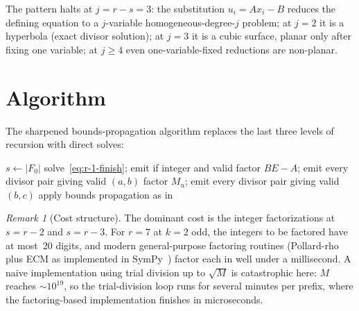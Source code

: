 \documentclass[11pt]{article}
\theoremstyle{definition}
\theoremstyle{remark}
\newtheorem{remark}[theorem]{Remark}
\begin{document}
The pattern halts at $j = r - s = 3$: the substitution
$u_i = Ax_i - B$ reduces the defining equation to a $j$-variable
homogeneous-degree-$j$ problem; at $j = 2$ it is a hyperbola (exact
divisor solution); at $j = 3$ it is a cubic surface, planar only after
fixing one variable; at $j \ge 4$ even one-variable-fixed reductions
are non-planar.


\section{Algorithm}\label{sec:algorithm}

The sharpened bounds-propagation algorithm replaces the last three
levels of recursion with direct solves:

\begin{algorithm}[H]
\caption{Sharpened bounds propagation for $k$-Lehmer enumeration}
\label{alg:sharp}
\begin{algorithmic}[1]
\State $s \gets |F_0|$
    \State solve~\eqref{eq:r-1-finish}; emit if integer and valid
    \State factor $BE - A$; emit every divisor pair giving valid $(a, b)$
        \State factor $M_u$; emit every divisor pair giving valid $(b, c)$
    \EndFor
\Else
    \State apply bounds propagation as in~\cite{MS26}
        \State {}
    \EndFor
\EndIf
\EndProcedure
\end{algorithmic}
\end{algorithm}

\begin{remark}[Cost structure]
The dominant cost is the integer factorizations at $s = r - 2$ and
$s = r - 3$.  For $r = 7$ at $k = 2$ odd, the integers to be factored
have at most~20 digits, and modern general-purpose factoring routines
(Pollard-rho plus ECM as implemented in SymPy~\cite{sympy}) factor
each in well under a millisecond.  A naive implementation using trial
division up to $\sqrt{M}$ is catastrophic here: $M$ reaches $\sim
10^{19}$, so the trial-division loop runs for several minutes per
prefix, where the factoring-based implementation finishes in
microseconds.
\end{remark}
\end{document}
